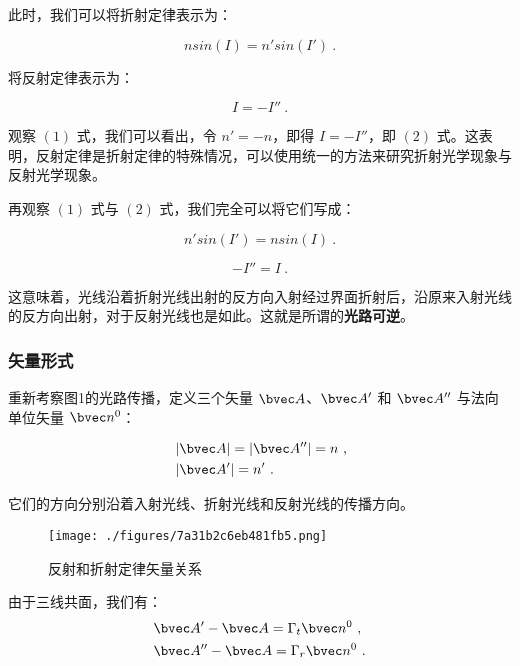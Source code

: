 此时，我们可以将折射定律表示为：

\begin{equation}
nsin(I)=n'sin(I') ~.
\end{equation}

将反射定律表示为：

\begin{equation}
I=-I'' ~.
\end{equation}

观察 $(1)$ 式，我们可以看出，令 $n'=-n$，即得 $I=-I''$，即 $(2)$ 式。这表明，反射定律是折射定律的特殊情况，可以使用统一的方法来研究折射光学现象与反射光学现象。

再观察 $(1)$ 式与 $(2)$ 式，我们完全可以将它们写成：

\begin{equation}
n'sin(I')=nsin(I) ~.
\end{equation}

\begin{equation}
-I''=I ~.
\end{equation}

这意味着，光线沿着折射光线出射的反方向入射经过界面折射后，沿原来入射光线的反方向出射，对于反射光线也是如此。这就是所谓的\textbf{光路可逆}。

\subsubsection{矢量形式}

重新考察图1的光路传播，定义三个矢量 $\bvec A$、$\bvec A'$ 和 $\bvec A''$ 与法向单位矢量 $\bvec n^0$：

\begin{equation}
\begin{aligned}
& \left| \bvec A \right| = \left| \bvec A'' \right| = n ~, \\
& \left| \bvec A' \right| = n' ~.
\end{aligned}
\end{equation}

它们的方向分别沿着入射光线、折射光线和反射光线的传播方向。

\begin{figure}[ht]
\centering
\texttt{[image: ./figures/7a31b2c6eb481fb5.png]}
\caption{反射和折射定律矢量关系} \label{fig_GeOp2_2}
\end{figure}

由于三线共面，我们有：
\begin{equation}
\begin{aligned}
& \bvec A' - \bvec A = \Gamma _ t \bvec n^0 ~, \\
& \bvec A'' - \bvec A = \Gamma _ r \bvec n^0 ~.
\end{aligned}
\end{equation}

